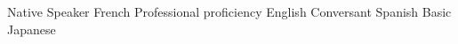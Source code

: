 \begin{cvhonors}
  \cvhonor
    {}
    {Native Speaker}
    {}
    {French}
    \cvhonor
    {}
    {Professional proficiency}
    {}
    {English}
    \cvhonor
    {}
    {Conversant}
    {}
    {Spanish}
    \cvhonor
    {}
    {Basic}
    {}
    {Japanese}
\end{cvhonors}
